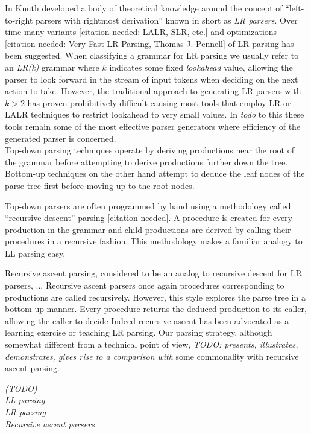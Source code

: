 \documentclass[a4paper,11pt]{article}
\begin{document}
In \cite{knuth65} Knuth developed a body of theoretical knowledge around the concept of ``left-to-right parsers with rightmost derivation'' known in short as \emph{LR parsers}. 
Over time many variants [citation needed: LALR, SLR, etc.] and optimizations [citation needed: Very Fast LR Parsing, Thomas J. Pennell] of LR parsing has been suggested.
When classifying a grammar for LR parsing we usually refer to an \emph{LR(k)} grammar where $k$ indicates some fixed \emph{lookahead} value,
allowing the parser to look forward in the stream of input tokens when deciding on the next action to take.
However, the traditional approach to generating LR parsers with $k > 2$ has proven prohibitively difficult causing most tools that employ LR or LALR techniques to restrict lookahead to very small values.
In \emph{todo} to this these tools remain some of the most effective parser generators where efficiency of the generated parser is concerned.\\

Top-down parsing techniques operate by deriving productions near the root of the grammar before attempting to derive productions further down the tree.
Bottom-up techniques on the other hand attempt to deduce the leaf nodes of the parse tree first before moving up to the root nodes.

Top-down parsers are often programmed by hand using a methodology called ``recursive descent'' parsing [citation needed].
A procedure is created for every production in the grammar and child productions are derived by calling their procedures in a recursive fashion.
This methodology makes a familiar analogy to LL parsing easy.

Recursive ascent parsing, considered to be an analog to recursive descent for LR parsers, ... Recursive ascent parsers %
once again procedures corresponding to productions are called recursively. 
However, this style explores the parse tree in a bottom-up manner.
Every procedure returns the deduced production to its caller, allowing the caller to decide 
Indeed recursive ascent has been advocated as a learning exercise or teaching LR parsing. %
Our parsing strategy, although somewhat different from a technical point of view, \emph{TODO: presents, illustrates, demonstrates, gives rise to a comparison with} some commonality with recursive ascent parsing.

\emph{(TODO)\\ %
LL parsing\\
LR parsing \cite{knuth65}\\
Recursive ascent parsers \cite{13326, 47909, 770849} }
\end{document}
